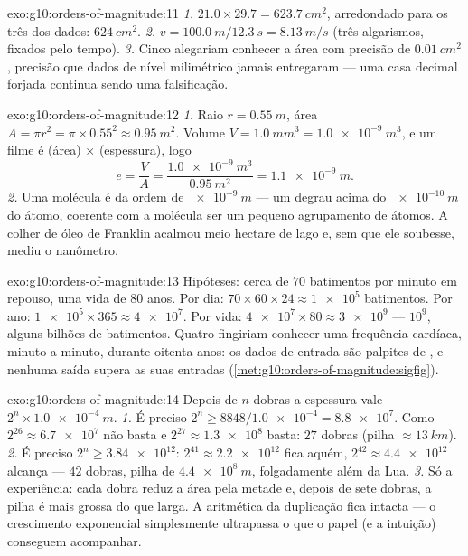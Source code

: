 \begin{solution}{exo:g10:orders-of-magnitude:11}
\emph{1.} $21.0 \times 29.7 = \qty{623.7}{cm^2}$, arredondado para os
três  dos dados: $\qty{624}{cm^2}$.
\emph{2.} $v = \qty{100.0}{m}/\qty{12.3}{s} = \qty{8.13}{m/s}$ (três
algarismos, fixados pelo tempo).
\emph{3.} Cinco  alegariam conhecer a área com
precisão de $\qty{0.01}{cm^2}$, precisão que dados de nível milimétrico
jamais entregaram --- uma casa decimal forjada continua sendo uma
falsificação.
\end{solution}

\begin{solution}{exo:g10:orders-of-magnitude:12}
\emph{1.} Raio $r = \qty{0.55}{m}$, área
$A = \pi r^{2} = \pi \times 0.55^{2} \approx \qty{0.95}{m^2}$. Volume
$V = \qty{1.0}{mm^3} = \qty{1.0e-9}{m^3}$, e um filme é (área)
$\times$ (espessura), logo
\[
e = \frac{V}{A} = \frac{\qty{1.0e-9}{m^3}}{\qty{0.95}{m^2}}
= \qty{1.1e-9}{m} .
\]
\emph{2.} Uma molécula é da ordem de $\qty{e-9}{m}$ --- um degrau acima
do $\qty{e-10}{m}$ do átomo, coerente com a molécula ser um pequeno
agrupamento de átomos. A colher de óleo de Franklin acalmou meio hectare
de lago e, sem que ele soubesse, mediu o nanômetro.
\end{solution}

\begin{solution}{exo:g10:orders-of-magnitude:13}
Hipóteses: cerca de $70$ batimentos por minuto em repouso, uma vida de
$80$ anos. Por dia: $70 \times 60 \times 24 \approx \num{1e5}$
batimentos. Por ano: $\num{1e5} \times 365 \approx \num{4e7}$. Por vida:
$\num{4e7} \times 80 \approx \num{3e9}$ ---  $10^{9}$,
alguns bilhões de batimentos. Quatro  fingiriam
conhecer uma frequência cardíaca, minuto a minuto, durante oitenta anos:
os dados de entrada são palpites de , e nenhuma saída
supera as suas entradas (\cref{met:g10:orders-of-magnitude:sigfig}).
\end{solution}

\begin{solution}{exo:g10:orders-of-magnitude:14}
Depois de $n$ dobras a espessura vale $2^{n} \times \qty{1.0e-4}{m}$.
\emph{1.} É preciso $2^{n} \geq 8848/\num{1.0e-4} = \num{8.8e7}$. Como
$2^{26} \approx \num{6.7e7}$ não basta e $2^{27} \approx \num{1.3e8}$
basta: $27$ dobras (pilha $\approx \qty{13}{km}$).
\emph{2.} É preciso $2^{n} \geq \num{3.84e12}$: $2^{41} \approx
\num{2.2e12}$ fica aquém, $2^{42} \approx \num{4.4e12}$ alcança ---
$42$ dobras, pilha de $\qty{4.4e8}{m}$, folgadamente além da Lua.
\emph{3.} Só a experiência: cada dobra reduz a área pela metade e,
depois de sete dobras, a pilha é mais grossa do que larga. A aritmética
da duplicação fica intacta --- o crescimento exponencial simplesmente
ultrapassa o que o papel (e a intuição) conseguem acompanhar.
\end{solution}

